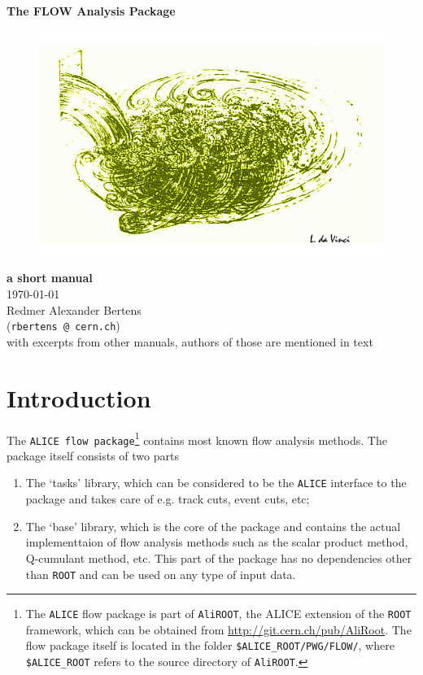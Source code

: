 \documentclass[a4paper]{book}
\numberwithin{equation}{subsection}
\renewcommand{\thefootnote}{\fnsymbol{footnote}}
\begin{document}
\noindent
\begin{center}
	\vspace*{1.5cm}
	{\LARGE \bf The FLOW Analysis Package}\\
		
	\vspace{1.5cm}
	\begin{figure}[hbt]
		\includegraphics[width=1.\textwidth]{figs/daVinci.png}
	\end{figure}
		
	\vspace{1.5cm}
	\noindent
	{\large \bf a short manual}\\
	\today\\
\vfill
\noindent
Redmer Alexander Bertens \\ (\texttt{rbertens @ cern.ch}) \\
with excerpts from other manuals, authors of those are mentioned in text
\end{center}

\clearpage
\thispagestyle{empty}
\tableofcontents
\renewcommand{\thefootnote}{\alph{footnote}}
\mainmatter
\chapter{Introduction}
The \texttt{ALICE flow package}\footnote{The \texttt{ALICE} flow package is part of \texttt{AliROOT}, the ALICE extension of the \texttt{ROOT} framework, which can be obtained from \href{http://git.cern.ch/pub/AliRoot}{http://git.cern.ch/pub/AliRoot}. The flow package itself is located in the folder \texttt{\$ALICE\_ROOT/PWG/FLOW/}, where \texttt{\$ALICE\_ROOT} refers to the source directory of \texttt{AliROOT}.} contains most known flow analysis methods. The package itself consists of two parts
\begin{enumerate}
    \item The `tasks' library, which can be considered to be the \texttt{ALICE} interface to the package and takes care of e.g. track cuts, event cuts, etc;
    \item The `base' library, which is the core of the package and contains the actual implementtaion of flow analysis methods such as the scalar product method, Q-cumulant method, etc. This part of the package has no dependencies other than \texttt{ROOT} and can be used on any type of input data.
\end{enumerate}
\end{document}
